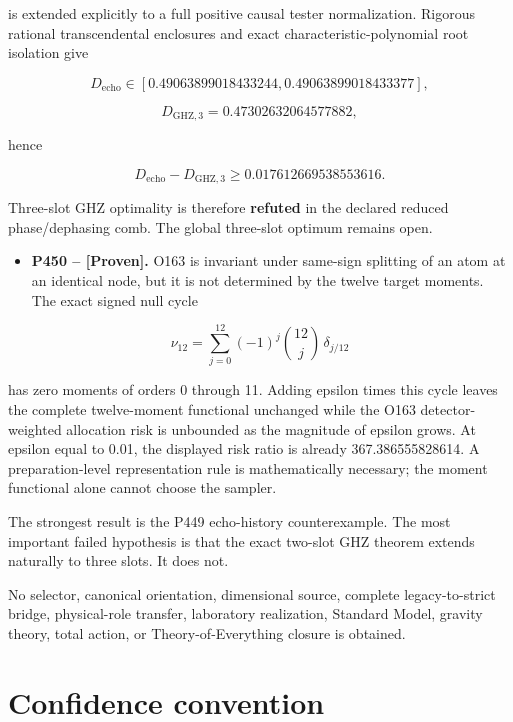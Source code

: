 \documentclass[11pt,a4paper,openany]{report}
\newcommand{\statusProven}{\textcolor{fingreen}{[Proven]}}
\begin{document}
is extended explicitly to a full positive causal tester normalization. Rigorous rational transcendental enclosures and exact characteristic-polynomial root isolation give

\[
D_{\mathrm{echo}}
\in[0.49063899018433244,
0.49063899018433377],
\]

\[
D_{\mathrm{GHZ},3}
=0.47302632064577882,
\]

hence

\[
D_{\mathrm{echo}}-D_{\mathrm{GHZ},3}
\ge0.017612669538553616.
\]

Three-slot GHZ optimality is therefore \textbf{refuted} in the declared reduced phase/\allowbreak{}dephasing comb. The global three-slot optimum remains open.

\begin{itemize}
\item 
\textbf{P450 -- \statusProven{}.} O163 is invariant under same-sign splitting of an atom at an identical node, but it is not determined by the twelve target moments. The exact signed null cycle

\end{itemize}

\[
\nu_{12}
=\sum_{j=0}^{12}(-1)^j\binom{12}{j}\,\delta_{j/12}
\]

has zero moments of orders 0 through 11. Adding epsilon times this cycle leaves the complete twelve-moment functional unchanged while the O163 detector-weighted allocation risk is unbounded as the magnitude of epsilon grows. At epsilon equal to 0.01, the displayed risk ratio is already 367.386555828614. A preparation-level representation rule is mathematically necessary; the moment functional alone cannot choose the sampler.

The strongest result is the P449 echo-history counterexample. The most important failed hypothesis is that the exact two-slot GHZ theorem extends naturally to three slots. It does not.

No selector, canonical orientation, dimensional source, complete legacy-to-strict bridge, physical-role transfer, laboratory realization, Standard Model, gravity theory, total action, or Theory-of-Everything closure is obtained.

\chapter{Confidence convention}
\end{document}
